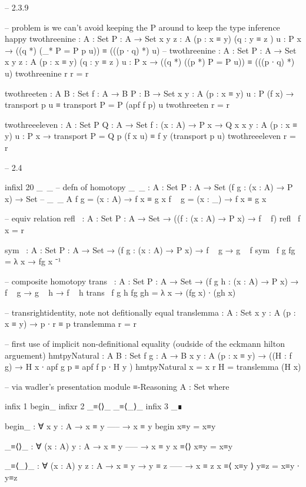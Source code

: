 \documentclass[11pt, a4paper]{article}
\begin{document}
\begin{code}
  -- 2.3.9

  -- problem is we can't avoid keeping the P around to keep the type inference happy
  twothreenine : {A : Set} {P : A → Set} {x y z : A}  (p : x ≡ y) (q : y ≡ z ) {u : P x} → ((q *) (_* {P = P} p u)) ≡ (((p ∙ q) *) u)
  -- twothreenine : {A : Set} {P : A → Set} {x y z : A}  (p : x ≡ y) (q : y ≡ z ) {u : P x} → ((q *) ((p *) {P = P} u)) ≡ (((p ∙ q) *) u)
  twothreenine r r = r

  twothreeten : {A B : Set} {f : A → B} {P : B → Set} {x y : A} (p : x ≡ y) {u : P (f x) }  → transport p u ≡ transport {P = P} (apf f p) u 
  twothreeten r = r

  twothreeeleven : {A : Set} {P Q : A → Set} {f : (x : A) → P x → Q x} {x y : A} (p : x ≡ y) {u : P x} → transport {P = Q} p (f x u) ≡ f y (transport p u)
  twothreeeleven r = r

  -- 2.4

  infixl 20 _~_
  -- defn of homotopy
  _~_ : {A : Set} {P : A → Set} (f g : (x : A) → P x) → Set
  -- _~_ {A} f g = (x : A) → f x ≡ g x
  f ~ g  = (x : _) → f x ≡ g x


  -- equiv relation
  refl~ : {A : Set} {P : A → Set} → ((f : (x : A) → P x) → f ~ f)
  refl~ f x = r

  sym~ : {A : Set} {P : A → Set} → (f g : (x : A) → P x) → f ~ g → g ~ f
  sym~ f g fg = λ x → fg x ⁻¹


  -- composite homotopy
  trans~ : {A : Set} {P : A → Set} → (f g h : (x : A) → P x) → f ~ g → g ~ h → f ~ h
  trans~ f g h fg gh = λ x → (fg x) ∙ (gh x)


  -- transrightidentity, note not defitionally equal
  translemma : {A : Set} {x y : A} (p : x ≡ y) → p ∙ r ≡ p
  translemma r = r

  -- first use of implicit non-definitional equality (oudside of the eckmann hilton arguement)
  hmtpyNatural : {A B : Set} {f g : A → B} {x y : A} (p : x ≡ y) → ((H : f ~ g) → H x ∙ apf g p ≡ apf f p ∙ H y )
  hmtpyNatural {x = x} r H = translemma (H x)

  -- via wadler's presentation
  module ≡-Reasoning {A : Set} where

    infix  1 begin_
    infixr 2 _≡⟨⟩_ _≡⟨_⟩_
    infix  3 _∎

    begin_ : ∀ {x y : A}
      → x ≡ y
      -----
      → x ≡ y
    begin x≡y  =  x≡y

    _≡⟨⟩_ : ∀ (x : A) {y : A}
      → x ≡ y
      -----
      → x ≡ y
    x ≡⟨⟩ x≡y  =  x≡y

    _≡⟨_⟩_ : ∀ (x : A) {y z : A}
      → x ≡ y
      → y ≡ z
      -----
      → x ≡ z
    x ≡⟨ x≡y ⟩ y≡z  =  x≡y ∙ y≡z


\end{code}
\end{document}
